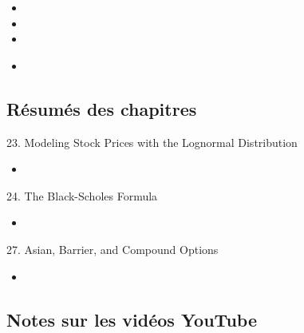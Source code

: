 \begin{ASM_chapter}
\begin{itemize}
	\item	{}
	\item	{}
	\item	{}
\end{itemize}
\end{ASM_chapter}

\begin{YTB_vids}
\begin{itemize}
	\item	
\end{itemize}
\end{YTB_vids}

\subsection{Résumés des chapitres}

\begin{CHPT_SUMM_AUTO}[label = {L.-23}]{23. Modeling Stock Prices with the Lognormal Distribution}
	\begin{itemize}
		\item	
	\end{itemize}
\end{CHPT_SUMM_AUTO}

\begin{CHPT_SUMM_AUTO}[label = {L.-24}]{24. The Black-Scholes Formula}
	\begin{itemize}
		\item	
	\end{itemize}
\end{CHPT_SUMM_AUTO}

\begin{CHPT_SUMM_AUTO}[label = {L.-27}]{{27. Asian, Barrier, and Compound Options}}
	\begin{itemize}
		\item	
	\end{itemize}
\end{CHPT_SUMM_AUTO}

\subsection{Notes sur les vidéos YouTube}

